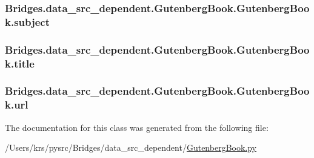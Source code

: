 \subsubsection[{subject}]{\setlength{\rightskip}{0pt plus 5cm}Bridges.\+data\+\_\+src\+\_\+dependent.\+Gutenberg\+Book.\+Gutenberg\+Book.\+subject}\label{class_bridges_1_1data__src__dependent_1_1_gutenberg_book_1_1_gutenberg_book_ad73cb81acfa22ae06d7e9814476a7d72}
\hypertarget{class_bridges_1_1data__src__dependent_1_1_gutenberg_book_1_1_gutenberg_book_afa38d09f6201d7795b9b2e06a5ce8779}{}
\subsubsection[{title}]{\setlength{\rightskip}{0pt plus 5cm}Bridges.\+data\+\_\+src\+\_\+dependent.\+Gutenberg\+Book.\+Gutenberg\+Book.\+title}\label{class_bridges_1_1data__src__dependent_1_1_gutenberg_book_1_1_gutenberg_book_afa38d09f6201d7795b9b2e06a5ce8779}
\hypertarget{class_bridges_1_1data__src__dependent_1_1_gutenberg_book_1_1_gutenberg_book_a615f07b0938c879140df8ca40d0a4aeb}{}
\subsubsection[{url}]{\setlength{\rightskip}{0pt plus 5cm}Bridges.\+data\+\_\+src\+\_\+dependent.\+Gutenberg\+Book.\+Gutenberg\+Book.\+url}\label{class_bridges_1_1data__src__dependent_1_1_gutenberg_book_1_1_gutenberg_book_a615f07b0938c879140df8ca40d0a4aeb}


The documentation for this class was generated from the following file\+:\begin{DoxyCompactItemize}
\item 
/\+Users/krs/pysrc/\+Bridges/data\+\_\+src\+\_\+dependent/\hyperlink{_gutenberg_book_8py}{Gutenberg\+Book.\+py}\end{DoxyCompactItemize}
